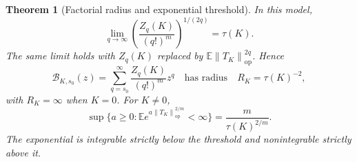 \documentclass[11pt,a4paper]{amsart}
\numberwithin{equation}{section}
\newtheorem{theorem}{Theorem}[section]
\theoremstyle{definition}
\theoremstyle{remark}
\newcommand{\E}{\mathbb E}
\newcommand{\op}{\mathrm{op}}
\newcommand{\norm}[1]{\left\lVert#1\right\rVert}
\begin{document}
\begin{theorem}[Factorial radius and exponential threshold]\label{thm:factorial_radius}
In this model,
\begin{equation}\label{eq:factorial_root}
 \lim_{q\to\infty}\left(\frac{Z_q(K)}{(q!)^m}\right)^{1/(2q)}=\tau(K).
\end{equation}
The same limit holds with $Z_q(K)$ replaced by $\E\norm{T_K}_{\op}^{2q}$. Hence
\begin{equation}\label{eq:spectral_borel_radius}
 \mathcal B_{K,s_0}(z)=\sum_{q=s_0}^\infty\frac{Z_q(K)}{(q!)^m}z^q
 \quad\text{has radius}\quad R_K=\tau(K)^{-2},
\end{equation}
with $R_K=\infty$ when $K=0$. For $K\ne0$,
\begin{equation}\label{eq:stretched_threshold}
 \sup\{a\ge0:\E e^{a\norm{T_K}_{\op}^{2/m}}<\infty\}
 =\frac{m}{\tau(K)^{2/m}}.
\end{equation}
The exponential is integrable strictly below the threshold and nonintegrable strictly above it.
\end{theorem}
\end{document}

